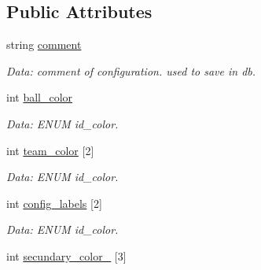 \subsection*{Public Attributes}
\begin{DoxyCompactItemize}
\item 
\hypertarget{structcommon_1_1ExecConfiguration_a98f8739d11ff3ab4e9e6f61a1d8084a4}{string \hyperlink{structcommon_1_1ExecConfiguration_a98f8739d11ff3ab4e9e6f61a1d8084a4}{comment}}\label{structcommon_1_1ExecConfiguration_a98f8739d11ff3ab4e9e6f61a1d8084a4}

\begin{DoxyCompactList}\small\item\em Data\-: comment of configuration. used to save in db. \end{DoxyCompactList}\item 
\hypertarget{structcommon_1_1ExecConfiguration_a08b7bbd7185afc2f9050850771af86c8}{int \hyperlink{structcommon_1_1ExecConfiguration_a08b7bbd7185afc2f9050850771af86c8}{ball\-\_\-color}}\label{structcommon_1_1ExecConfiguration_a08b7bbd7185afc2f9050850771af86c8}

\begin{DoxyCompactList}\small\item\em Data\-: E\-N\-U\-M id\-\_\-color. \end{DoxyCompactList}\item 
\hypertarget{structcommon_1_1ExecConfiguration_a2f8748f7ea7c3b21a580b9116efc5593}{int \hyperlink{structcommon_1_1ExecConfiguration_a2f8748f7ea7c3b21a580b9116efc5593}{team\-\_\-color} \mbox{[}2\mbox{]}}\label{structcommon_1_1ExecConfiguration_a2f8748f7ea7c3b21a580b9116efc5593}

\begin{DoxyCompactList}\small\item\em Data\-: E\-N\-U\-M id\-\_\-color. \end{DoxyCompactList}\item 
\hypertarget{structcommon_1_1ExecConfiguration_aa8dcf45e57d1a2e2264d75e2568e33bf}{int \hyperlink{structcommon_1_1ExecConfiguration_aa8dcf45e57d1a2e2264d75e2568e33bf}{config\-\_\-labels} \mbox{[}2\mbox{]}}\label{structcommon_1_1ExecConfiguration_aa8dcf45e57d1a2e2264d75e2568e33bf}

\begin{DoxyCompactList}\small\item\em Data\-: E\-N\-U\-M id\-\_\-color. \end{DoxyCompactList}\item 
\hypertarget{structcommon_1_1ExecConfiguration_a5485a96fed9500bddfd4a8ce81d9032c}{int \hyperlink{structcommon_1_1ExecConfiguration_a5485a96fed9500bddfd4a8ce81d9032c}{secundary\-\_\-color\-\_} \mbox{[}3\mbox{]}}\label{structcommon_1_1ExecConfiguration_a5485a96fed9500bddfd4a8ce81d9032c}


\end{DoxyCompactItemize}

